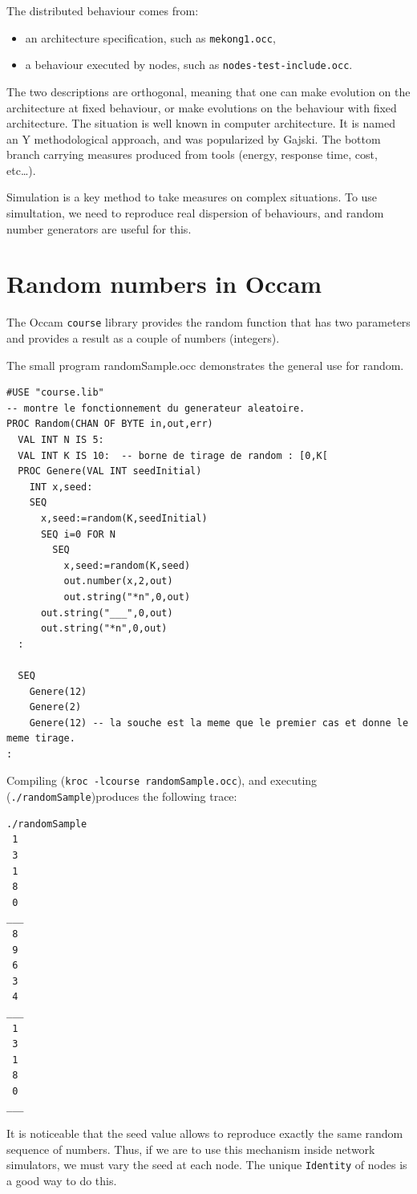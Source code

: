 The distributed behaviour comes from:

\begin{itemize}
\item an architecture specification, such as {\tt mekong1.occ},
\item a behaviour executed by nodes, such as {\tt nodes-test-include.occ}.
\end{itemize}

The two descriptions are orthogonal, meaning that one can make
evolution on the architecture at fixed behaviour, or make evolutions on
the behaviour with fixed architecture. The situation is well known
in computer architecture. It is named an Y methodological approach,
and was popularized by Gajski.
The bottom branch carrying measures produced from tools (energy, 
response time, cost, etc\ldots).

Simulation is a key method to take measures on complex situations.
To use simultation, we need to reproduce real dispersion of behaviours,
and random number generators are useful for this.

\section{Random numbers in Occam}

The Occam {\tt course} library provides the random function that
has two parameters and provides a result as a couple of numbers
(integers).

The small program {randomSample.occ}  demonstrates the general use for random.

\begin{lstlisting}  
#USE "course.lib"
-- montre le fonctionnement du generateur aleatoire.
PROC Random(CHAN OF BYTE in,out,err)
  VAL INT N IS 5: 
  VAL INT K IS 10:  -- borne de tirage de random : [0,K[
  PROC Genere(VAL INT seedInitial)
    INT x,seed:
    SEQ
      x,seed:=random(K,seedInitial)
      SEQ i=0 FOR N
        SEQ
          x,seed:=random(K,seed)
          out.number(x,2,out)
          out.string("*n",0,out)
      out.string("___",0,out)
      out.string("*n",0,out)
  :
  
  SEQ
    Genere(12)
    Genere(2)
    Genere(12) -- la souche est la meme que le premier cas et donne le meme tirage.
:
\end{lstlisting}

Compiling ({\tt kroc -lcourse randomSample.occ}), and executing  ({\tt ./randomSample})produces the 
following trace:
\begin{lstlisting}./randomSample
 1
 3
 1
 8
 0
___
 8
 9
 6
 3
 4
___
 1
 3
 1
 8
 0
___
\end{lstlisting}

It is noticeable that the seed value allows to reproduce exactly the same random sequence of numbers.
Thus, if we are to use this mechanism inside network simulators, we must vary the seed at each node.
The unique  {\tt Identity} of nodes is a good way to do this.
